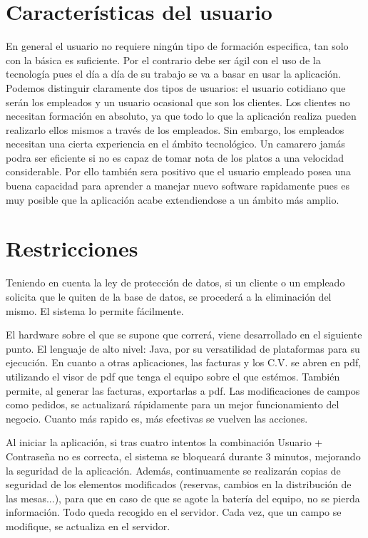 \documentclass[spanish,a4paper,11pt, twoside]{report}	%
\begin{document}
\section{Características del usuario}
	En general el usuario no requiere ningún tipo de formación especifica, tan solo con la básica es suficiente. Por el contrario debe ser ágil con el uso de la tecnología pues el día a día de su trabajo se va a basar en usar la aplicación. Podemos distinguir claramente dos tipos de usuarios: el usuario cotidiano que serán los empleados y un usuario ocasional que son los clientes. Los clientes no necesitan formación en absoluto, ya que todo lo que la aplicación realiza pueden realizarlo ellos mismos a través de los empleados. Sin embargo, los empleados necesitan una cierta experiencia en el ámbito tecnológico. Un camarero jamás podra ser eficiente si no es capaz de tomar nota de los platos a una velocidad considerable. Por ello también sera positivo que el usuario empleado posea una buena capacidad para aprender a manejar nuevo software rapidamente pues es muy posible que la aplicación acabe extendiendose a un ámbito más amplio.

\section{Restricciones}

Teniendo en cuenta la ley de protección de datos, si un cliente o un empleado solicita que le quiten de la base de datos, se procederá a la eliminación del mismo. El sistema lo permite fácilmente. 

El hardware sobre el que se supone que correrá, viene desarrollado en el siguiente punto. El lenguaje de alto nivel: Java, por su versatilidad de plataformas para su ejecución. En cuanto a otras aplicaciones, las facturas y los C.V. se abren en pdf, utilizando el visor de pdf que tenga el equipo sobre el que estémos. También permite, al generar las facturas, exportarlas a pdf. Las modificaciones de campos como pedidos, se actualizará rápidamente para un mejor funcionamiento del negocio. Cuanto más rapido es, más efectivas se vuelven las acciones.

Al iniciar la aplicación, si tras cuatro intentos la combinación Usuario + Contraseña no es correcta, el sistema se bloqueará durante 3 minutos, mejorando la seguridad de la aplicación. Además, continuamente se realizarán copias de seguridad de los elementos modificados (reservas, cambios en la distribución de las mesas...), para que en caso de que se agote la batería del equipo, no se pierda información. Todo queda recogido en el servidor. Cada vez, que un campo se modifique, se actualiza en el servidor.
\end{document}

